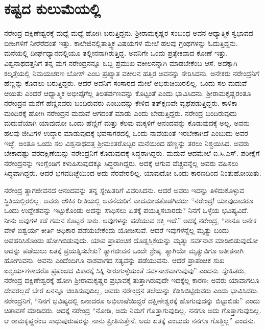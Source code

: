 
\chapter{ಕಷ್ಟದ ಕುಲುಮೆಯಲ್ಲಿ}

ನರೇಂದ್ರ ದಕ್ಷಿಣೇಶ್ವರಕ್ಕೆ ಮಧ್ಯೆ ಮಧ್ಯೆ ಹೋಗಿ ಬರುತ್ತಿದ್ದನು. ಶ‍್ರೀರಾಮಕೃಷ್ಣರ ಸಂಬಂಧ ಅವನ ಆಧ್ಯಾತ್ಮಿಕ ಸ್ವಭಾವದ ಬೀಜಗಳಿಗೆ ನೀರೆರೆದಂತೆ ಇತ್ತು. ಕಾಲೇಜಿನಲ್ಲಿ\break ತಾತ್ತ್ವಿಕ ವಿಷಯಗಳ ಮೇಲೆ ಹಲವು ಗ್ರಂಥಗಳನ್ನು ಓದುತ್ತಿದ್ದನು. ಮನೆಯಲ್ಲಿ ದೀರ್ಘ\-ಧ್ಯಾನದಲ್ಲಿಯೂ ತಲ್ಲೀನನಾಗಿರುತ್ತಿದ್ದ. ಅವನಿಗೇ ಒಂದು ಪ್ರತ್ಯೇಕವಾದ ಕೋಣೆ ಇತ್ತು. ವಿಶ್ವನಾಥದತ್ತನಿಗೆ ತನ್ನ ಮಗ ನರೇಂದ್ರನನ್ನೂ ಒಬ್ಬ ಪ್ರಮುಖ ವಕೀಲನನ್ನಾಗಿ ಮಾಡಬೇಕೆಂಬ ಆಸೆ. ಅದಕ್ಕಾಗಿ ಕಲ್ಕತ್ತೆಯಲ್ಲಿ ನಿಮಯಚರಣ ಬೋಸ್ ಎಂಬ ಪ್ರಖ್ಯಾತ ವಕೀಲನ ಹತ್ತಿರ ಅವನನ್ನು ಸೇರಿಸಿದನು. ಅನೇಕರು ನರೇಂದ್ರನಿಗೆ ಹೆಣ್ಣನ್ನು ಕೊಡಲು ಬರುತ್ತಿದ್ದರು. ಆದರೆ ಅವನಿಗೆ ಸಂಸಾರದ ಮೇಲೆ ಅಭಿರುಚಿಯಿರಲಿಲ್ಲ. ಒಂದು ಸಲ ಮದುವೆ ಆಯಿತು ಎಂದರೆ ಆಧ್ಯಾತ್ಮಿಕ ಅಭೀಪ್ಸೆಗೆಲ್ಲ ತಿಲತರ್ಪಣವನ್ನು ಕೊಟ್ಟಂತೆ ಎಂದು ಭಾವಿಸಿದನು. ಶ‍್ರೀರಾಮಕೃಷ್ಣರಂತೂ ನರೇಂದ್ರನ ಮನೆಗೆ ಹೆಣ್ಣಿನವರು ಬಂದಿರುವರು ಎಂಬುದನ್ನು ಕೇಳಿದ ತತ್‍ಕ್ಷಣವೇ ವ್ಯಥೆಪಡುತ್ತಿದ್ದರು. ಕಾಳಿಕಾ ಮಂದಿರಕ್ಕೆ ಹೋಗಿ ನರೇಂದ್ರನ ಮದುವೆ ಆಗದಂತೆ ಮಾಡು ಎಂದು ಬೇಡುತ್ತಿದ್ದರು. ನರೇಂದ್ರ ಬಂದಿರುವುದು ಮದುವೆಯಾಗಿ ಯಾವುದೋ ಒಂದು ಹೆಣ್ಣಿಗೆ ಮತ್ತು ಕೆಲವು ಮಕ್ಕಳಿಗೆ ಆನಂದವನ್ನು ಕೊಡುವುದಕ್ಕೆ ಅಲ್ಲ. ಅವನು ಹಲವು ಜೀವಿಗಳ ಉದ್ಧಾರ ಮಾಡುವುದಕ್ಕೆ ಭವಸಾಗರದಲ್ಲಿ ಒಂದು ನಾವೆಯಂತೆ ಇರಬೇಕಾಗಿದೆ ಎಂಬುದು ಅವರ ಇಚ್ಛೆ. ಅಂತೂ ಒಂದು ಸಲ ವಿಶ್ವನಾಥದತ್ತ ಶ‍್ರೀಮಂತರೊಬ್ಬರ ಮನೆಯಿಂದ ಹೆಣ್ಣನ್ನು ತರಲು ನಿಶ್ಚಯಿಸಿದ. ಅವರು ಬೇಕಾದಷ್ಟು ವರದಕ್ಷಿಣೆಯನ್ನು ನರೇಂದ್ರನಿಗೆ ಕೊಡುವುದಕ್ಕೆ ಸಿದ್ಧರಾಗಿದ್ದರು. ಮದುವೆ ಆದಮೇಲೆ ಐ.ಸಿ.ಎಸ್. ಪರೀಕ್ಷೆಗೆ ನರೇಂದ್ರನನ್ನು ಇಂಗ್ಲೆಂಡಿಗೆ ಕಳುಹಿಸುವುದಕ್ಕೂ ಸಿದ್ಧರಾಗಿದ್ದರು. ಅದಕ್ಕೆ ಆಗುವ ವೆಚ್ಚವನ್ನೆಲ್ಲ ಅವರು ವಹಿಸಲು ಸಿದ್ಧವಾಗಿದ್ದರು. ಆದರೆ ಭಗವದಿಚ್ಛೆಯಿಂದ ಅದು ನೆರವೇರಲಿಲ್ಲ. ಯಾವುದೋ ಒಂದು ಕಾರಣದಿಂದ ನಿಂತುಹೋಯಿತು.

ನರೇಂದ್ರ ತ್ಯಾಗಜೀವನದ ಆನಂದವನ್ನು ತನ್ನ ಸ್ನೇಹಿತರಿಗೆ ವಿವರಿಸಿದನು. ಆದರೆ ಅವರು ಇದನ್ನು ತಿಳಿದುಕೊಳ್ಳುವ ಸ್ಥಿತಿಯಲ್ಲಿರಲಿಲ್ಲ. ಅವರು ಲೌಕಿಕ ರೀತಿಯಲ್ಲಿ ಅವನೆದುರಿಗೆ ವಾದಮಾಡತೊಡಗಿದರು: “ನರೇಂದ್ರ! ಯಾವುದಾದರೂ ಒಂದು ಉದ್ದೇಶವನ್ನು ಇಟ್ಟುಕೊಂಡು ಅದನ್ನು ಸಾಧಿಸಲು ಏತಕ್ಕೆ ಪಯತ್ನಿಸಬಾರದು? ನಿನಗೆ ಒಳ್ಳೆಯ ಭವಿಷ್ಯವಿದೆ. ನೀನು ಅವುಗಳ ಕಡೆ ಗಮನ ಕೊಟ್ಟರೆ ಸಾಕು. ಅವುಗಳನ್ನು ಪಡೆಯುವ ಶಕ್ತಿ ಇದೆ.” ಅದಕ್ಕೆ ನರೇಂದ್ರ, “ನಾನೂ ಅನೇಕ ವೇಳೆ ಐಶ್ವರ್ಯ ಕೀರ್ತಿ ಅಧಿಕಾರ ಪಡೆಯಬೇಕೆಂದು ಯೋಚಿಸುವೆ. ಆದರೆ ಇವುಗಳನ್ನೆಲ್ಲ ಮೃತ್ಯು ಬಂದು ಅಪಹರಿಸಿಕೊಂಡು ಹೋಗಿಬಿಡುವುದು. ಯಾವ ಪ್ರಾಪಂಚಿಕ ದೊಡ್ಡಸ್ತಿಕೆಯನ್ನು ಮೃತ್ಯು ಸರ್ವನಾಶ ಮಾಡಿಬಿಡುವುದೋ ಅದನ್ನು ಪಡೆಯಲು ಏತಕ್ಕೆ ಪ್ರಯತ್ನಿಸಬೇಕು? ತ್ಯಾಗಜೀವನ ಒಂದೇ ಶ್ರೇಷ್ಠ. ತ್ಯಾಗಿಯೇ ಮೃತ್ಯುವಿಗೂ ಅತೀತನಾಗಿ ಹೋಗುವನು. ಅವನು ಎಂದೆಂದಿಗೂ ನಾಶವಾಗದ ಸತ್ಯವನ್ನು ಪಡೆಯುವನು. ಆದರೆ ಪ್ರಾಪಂಚಿಕ ಸುಖ ಐಶ್ವರ್ಯಗಳಾದರೊ ಪ್ರಪಂಚದ ವಿಕಾರಕ್ಕೆ ಸಿಕ್ಕಿ ನೀರುಗುಳ್ಳೆಯಂತೆ ಸರ್ವನಾಶವಾಗುವುವು” ಎಂದನು. ಸ್ನೇಹಿತರು, ನರೇಂದ್ರ ದಕ್ಷಿಣೇಶ್ವರಕ್ಕೆ ಹೋಗಿ ಶ‍್ರೀರಾಮಕೃಷ್ಣರ ಪ್ರಭಾವಕ್ಕೆ ತುತ್ತಾಗಿರುವುದೇ ಇದಕ್ಕೆಲ್ಲ ಕಾರಣ; ಅವರು ಯಾವಾಗಲೂ ದೇವರಲ್ಲದೆ ಬೇರೆ ಏನನ್ನೂ ಚಿಂತಿಸುವುದಿಲ್ಲ, ಅವರು ನರೇಂದ್ರನ ತಲೆಯನ್ನು ಕೆಡಿಸಿಬಿಟ್ಟಿರುವರು ಎಂದು ಭಾವಿಸಿದರು. ನರೇಂದ್ರನಿಗೆ, “ನಿನಗೆ ಭವಿಷ್ಯದಲ್ಲಿ ಏನಾದರೂ ಅಭಿಲಾಷೆಯಿದ್ದರೆ ದಕ್ಷಿಣೇಶ್ವರಕ್ಕೆ ಹೊಗುವುದನ್ನು ಬಿಟ್ಟುಬಿಡು” ಎಂದು ಚಿತಾವಣೆ ಮಾಡಿದರು. ಅದಕ್ಕೆ ನರೇಂದ್ರ “ನೋಡಿ, ಅದು ನಿಮಗೆ ಗೊತ್ತಾಗುವುದಿಲ್ಲ. ನನಗೂ ಅದು ಗೊತ್ತಾಗುವುದಿಲ್ಲ. ಆ ರಾಮಕೃಷ್ಣರೆಂಬ ಸಾಧುಪುರುಷರನ್ನು ನಾನು ಪ್ರೀತಿಸುತ್ತೇನೆ. ಅದು ಏತಕ್ಕೆ ಎಂಬುದು ನನಗೂ ಗೊತ್ತಿಲ್ಲ” ಎಂದನು.

